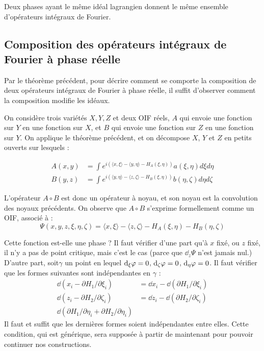 \begin{corr}
	Deux phases ayant le même idéal lagrangien donnent le même ensemble d'opérateurs intégraux de Fourier.
\end{corr}

\subsection{Composition des opérateurs intégraux de Fourier à phase réelle}
Par le théorème précédent, pour décrire comment se comporte la composition de deux opérateurs intégraux de Fourier à phase réelle, il suffit d'observer comment la composition modifie les idéaux.

On considère trois variétés $X,Y,Z$ et deux OIF réels, $A$ qui envoie une fonction sur $Y$ en une fonction sur $X$, et $B$ qui envoie une fonction sur $Z$ en une fonction sur $Y$. On applique le théorème précédent, et on décompose $X$, $Y$ et $Z$ en petits ouverts sur lesquels :

\begin{align*}
	A(x,y)&=\int e^{i(\langle x,\xi\rangle - \langle y,\eta\rangle-H_A(\xi,\eta))}a(\xi,\eta)d\xi d\eta\\
	B(y,z)&=\int e^{i(\langle y,\eta\rangle - \langle z,\zeta\rangle -H_B(\xi,\eta))}b(\eta,\zeta)d\eta d\zeta
\end{align*}

L'opérateur $A\circ B$ est donc un opérateur à noyau, et son noyau est la convolution des noyaux précédents. On observe que $A\circ B$ s'exprime formellement comme un OIF, associé à :
\begin{equation}
	\Psi(x,y,z,\xi,\eta,\zeta)=\langle x,\xi\rangle - \langle z,\zeta\rangle - H_A(\xi,\eta)-H_B(\eta,\zeta)
\end{equation}

Cette fonction est-elle une phase ? Il faut vérifier d'une part qu'à $x$ fixé, ou $z$ fixé, il n'y a pas de point critique, mais c'est le cas (parce que $\dd_z\Psi$ n'est jamais nul.) D'autre part, soit$\gamma$ un point en lequel $\mathrm{d}_{\xi}\varphi=0$, $\mathrm{d}_{\zeta}\varphi=0$, $\mathrm{d}_{\eta}\varphi=0$. Il faut vérifier que les formes suivantes sont indépendantes en $\gamma$ :
\begin{align*}
	\dd(x_i - \partial H_1/\partial \xi_i) &= \dd x_i - \dd (\partial H_1/\partial \xi_i)\\
	\dd(z_i - \partial H_2/\partial \zeta_i) &= \dd z_i - \dd (\partial H_2/\partial \zeta_i)\\
	\dd(\partial H_1/\partial \eta_i + \partial H_2/\partial \eta_i)
\end{align*}
Il faut et suffit que les dernières formes soient indépendantes entre elles. Cette condition, qui est générique, sera supposée à partir de maintenant pour pouvoir continuer nos constructions.

